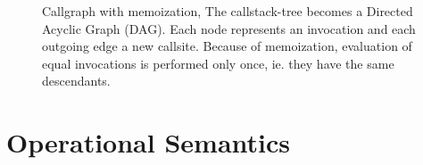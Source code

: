 \begin{figure}
    \centering
    
    \caption{Callgraph with memoization, The callstack-tree becomes a Directed Acyclic Graph (DAG). Each node represents an invocation and each outgoing edge a new callsite. Because of memoization, evaluation of equal invocations is performed only once, ie. they have the same descendants.}
    \label{fig:fib_callstack_memoization}
\end{figure}

\section{Operational Semantics}\label{SOS}